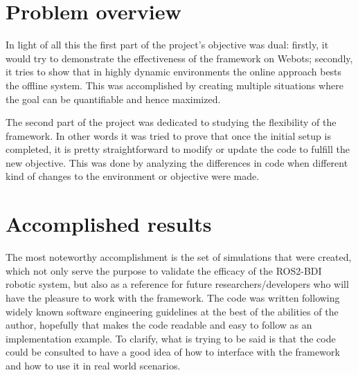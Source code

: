 \section{Problem overview}
In light of all this the first part of the project's objective was dual: firstly, it would try to demonstrate the effectiveness of the framework on Webots; secondly, it tries to show that in highly dynamic environments the online approach bests the offline system. This was accomplished by creating multiple situations where the goal can be quantifiable and hence maximized.
\par
The second part of the project was dedicated to studying the flexibility of the framework. In other words it was tried to prove that once the initial setup is completed, it is pretty straightforward to modify or update the code to fulfill the new objective. This was done by analyzing the differences in code when different kind of changes to the environment or objective were made.
\section{Accomplished results}
The most noteworthy accomplishment is the set of simulations that were created, which not only serve the purpose to validate the efficacy of the ROS2-BDI robotic system, but also as a reference for future researchers/developers who will have the pleasure to work with the framework. The code was written following widely known software engineering guidelines at the best of the abilities of the author, hopefully that makes the code readable and easy to follow as an implementation example. To clarify, what is trying to be said is that the code could be consulted to have a good idea of how to interface with the framework and how to use it in real world scenarios. 

